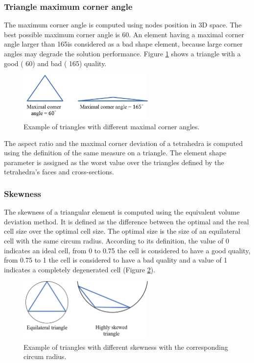 \subsubsection*{Triangle maximum corner angle}
The maximum corner angle is computed using nodes position in 3D space. The best possible maximum corner angle is 60\textdegree. An element having a maximal corner angle larger than 165\textdegree is considered as a bad shape element, because large corner angles may degrade the solution performance. Figure \ref{fig:cornerangle} shows a triangle with a good ( 60\textdegree) and bad ( 165\textdegree) quality. 

 \begin{figure}[!h]
\centering
\includegraphics[width=0.6\textwidth,keepaspectratio]{figures/maximalcornerangle.png} 
\caption{Example of triangles with different maximal corner angles.}
\label{fig:cornerangle}
\end{figure} 

The aspect ratio and the maximal corner deviation of a tetrahedra is computed using the definition of the same measure on a triangle. The element shape parameter is assigned as the worst value over the triangles defined by the tetrahedra's faces and cross-sections.  

\subsubsection*{Skewness }
The skewness of a triangular element is computed using the equivalent volume deviation method. It is defined as the difference between the optimal and the real cell size over the optimal cell size. The optimal size is the size of an equilateral cell with the same circum radius. According to its definition, the value of 0 indicates an ideal cell, from 0 to 0.75 the cell is considered to have a good quality, from 0.75 to 1 the cell is considered to have a bad quality and a value of 1 indicates a completely degenerated cell (Figure \ref{fig:skewness}).   

 \begin{figure}[!h]
\centering
\includegraphics[width=0.6\textwidth,keepaspectratio]{figures/skewness.png} 
\caption{Example of triangles with different skewness with the corresponding circum radius.}
\label{fig:skewness}
\end{figure}
 
